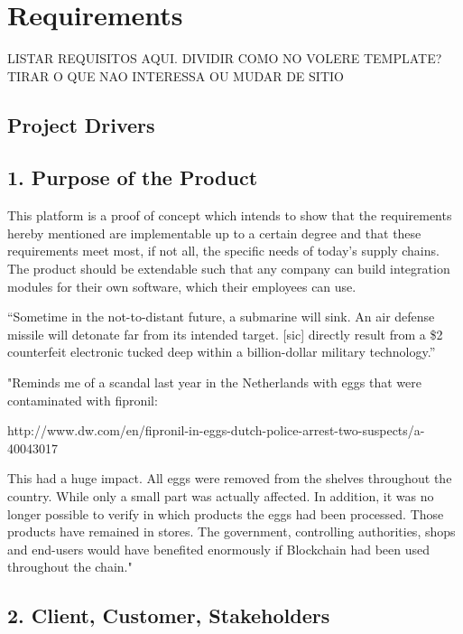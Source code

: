 
\section{Requirements}

LISTAR REQUISITOS AQUI. DIVIDIR COMO NO VOLERE TEMPLATE? TIRAR O QUE NAO INTERESSA OU MUDAR DE SITIO



\subsection{Project Drivers}

	\subsection*{1. Purpose of the Product}

	This platform is a proof of concept which intends to show that the requirements hereby mentioned are implementable up to a certain degree and that these requirements meet most, if not all, the specific needs of today's supply chains. The product should be extendable such that any company can build integration modules for their own software, which their employees can use.
	
	“Sometime in the not-to-distant future, a submarine will sink. An air defense missile will detonate far from its intended target. [sic] directly result from a \$2 counterfeit electronic tucked deep within a billion-dollar military technology.”
	
	"Reminds me of a scandal last year in the Netherlands with eggs that were contaminated with fipronil:
	
	http://www.dw.com/en/fipronil-in-eggs-dutch-police-arrest-two-suspects/a-40043017
	
	This had a huge impact. All eggs were removed from the shelves throughout the country. While only a small part was actually affected. In addition, it was no longer possible to verify in which products the eggs had been processed. Those products have remained in stores. The government, controlling authorities, shops and end-users would have benefited enormously if Blockchain had been used throughout the chain."
	
    \subsection*{2. Client, Customer, Stakeholders}
	
